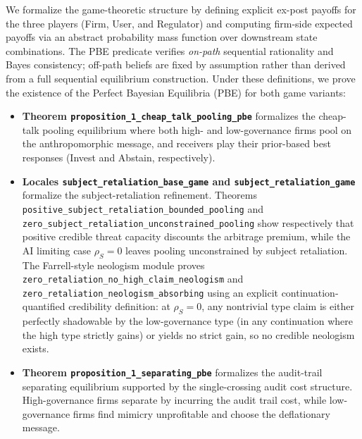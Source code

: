\documentclass[review,authoryear]{elsarticle}
\theoremstyle{definition}
\theoremstyle{plain}
\begin{document}
We formalize the game-theoretic structure by defining explicit ex-post payoffs for the three players (Firm, User, and Regulator) and computing firm-side expected payoffs via an abstract probability mass function over downstream state combinations. The PBE predicate verifies \emph{on-path} sequential rationality and Bayes consistency; off-path beliefs are fixed by assumption rather than derived from a full sequential equilibrium construction. Under these definitions, we prove the existence of the Perfect Bayesian Equilibria (PBE) for both game variants:
\begin{itemize}\sloppy
    \item \textbf{Theorem \texttt{proposition\_\allowbreak{}1\_\allowbreak{}cheap\_\allowbreak{}talk\_\allowbreak{}pooling\_\allowbreak{}pbe}} formalizes the cheap-talk pooling equilibrium where both high- and low-governance firms pool on the anthropomorphic message, and receivers play their prior-based best responses (Invest and Abstain, respectively).
    \item \textbf{Locales \texttt{subject\_\allowbreak{}retaliation\_\allowbreak{}base\_\allowbreak{}game} and \texttt{subject\_\allowbreak{}retaliation\_\allowbreak{}game}} formalize the subject-retaliation refinement. Theorems \texttt{positive\_\allowbreak{}subject\_\allowbreak{}retaliation\_\allowbreak{}bounded\_\allowbreak{}pooling} and \texttt{zero\_\allowbreak{}subject\_\allowbreak{}retaliation\_\allowbreak{}unconstrained\_\allowbreak{}pooling} show respectively that positive credible threat capacity discounts the arbitrage premium, while the AI limiting case $\rho_S=0$ leaves pooling unconstrained by subject retaliation. The Farrell-style neologism module proves \texttt{zero\_\allowbreak{}retaliation\_\allowbreak{}no\_\allowbreak{}high\_\allowbreak{}claim\_\allowbreak{}neologism} and \texttt{zero\_\allowbreak{}retaliation\_\allowbreak{}neologism\_\allowbreak{}absorbing} using an explicit continuation-quantified credibility definition: at $\rho_S=0$, any nontrivial type claim is either perfectly shadowable by the low-governance type (in any continuation where the high type strictly gains) or yields no strict gain, so no credible neologism exists.
    \item \textbf{Theorem \texttt{proposition\_\allowbreak{}1\_\allowbreak{}separating\_\allowbreak{}pbe}} formalizes the audit-trail separating equilibrium supported by the single-crossing audit cost structure. High-governance firms separate by incurring the audit trail cost, while low-governance firms find mimicry unprofitable and choose the deflationary message.
\end{itemize}
\end{document}
